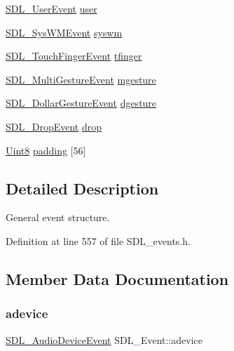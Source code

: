 \begin{DoxyCompactItemize}
\mbox{\hyperlink{struct_s_d_l___user_event}{S\+D\+L\+\_\+\+User\+Event}} \mbox{\hyperlink{union_s_d_l___event_ab7c394e3ce7bf1e4f8d68bc0e9f1b042}{user}}
\item 
\mbox{\hyperlink{struct_s_d_l___sys_w_m_event}{S\+D\+L\+\_\+\+Sys\+W\+M\+Event}} \mbox{\hyperlink{union_s_d_l___event_ab3b2eaf5348d4c50a51b1f297fdef537}{syswm}}
\item 
\mbox{\hyperlink{struct_s_d_l___touch_finger_event}{S\+D\+L\+\_\+\+Touch\+Finger\+Event}} \mbox{\hyperlink{union_s_d_l___event_ab18d7d60794cb056948ffa58541bc3c5}{tfinger}}
\item 
\mbox{\hyperlink{struct_s_d_l___multi_gesture_event}{S\+D\+L\+\_\+\+Multi\+Gesture\+Event}} \mbox{\hyperlink{union_s_d_l___event_ac19b3c6a6b5181a51eb4fbe2cbe726a9}{mgesture}}
\item 
\mbox{\hyperlink{struct_s_d_l___dollar_gesture_event}{S\+D\+L\+\_\+\+Dollar\+Gesture\+Event}} \mbox{\hyperlink{union_s_d_l___event_a4481167b9f8549aeb254e97ca812e74d}{dgesture}}
\item 
\mbox{\hyperlink{struct_s_d_l___drop_event}{S\+D\+L\+\_\+\+Drop\+Event}} \mbox{\hyperlink{union_s_d_l___event_acff77bccbca65abbb876360a3f5209c9}{drop}}
\item 
\mbox{\hyperlink{_s_d_l__stdinc_8h_a2944638813a090aa23e62f4da842c3e2}{Uint8}} \mbox{\hyperlink{union_s_d_l___event_aabb599570edfa54aad6255c1f24f2ad2}{padding}} \mbox{[}56\mbox{]}
\end{DoxyCompactItemize}


\subsection{Detailed Description}
General event structure. 

Definition at line 557 of file S\+D\+L\+\_\+events.\+h.



\subsection{Member Data Documentation}
\mbox{\label{union_s_d_l___event_a111e01fcac4fd8e251a6058ff9f17e72}} 
\subsubsection{\texorpdfstring{adevice}{adevice}}
{\footnotesize\ttfamily \mbox{\hyperlink{struct_s_d_l___audio_device_event}{S\+D\+L\+\_\+\+Audio\+Device\+Event}} S\+D\+L\+\_\+\+Event\+::adevice}

